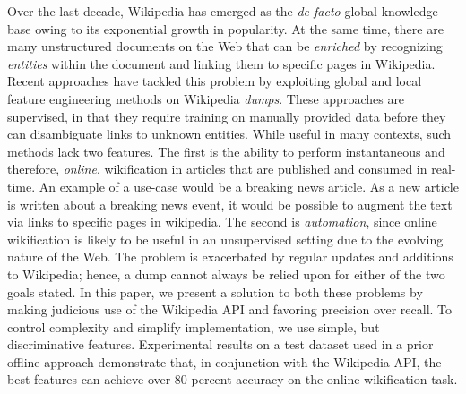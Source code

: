Over the last decade, Wikipedia has emerged as the \emph{de facto} global knowledge base owing to its exponential growth in popularity. At the same time, there are many unstructured documents on the Web that can be \emph{enriched} by recognizing \emph{entities} within the document and linking them to specific pages in Wikipedia. Recent approaches have tackled this problem by exploiting global and local feature engineering methods on Wikipedia \emph{dumps}. These approaches are supervised, in that they require training on manually provided data before they can disambiguate links to unknown entities. While useful in many contexts, such methods lack two features. The first is the ability to perform instantaneous and therefore, \emph{online}, wikification in articles that are published and consumed in real-time. An example of a use-case would be a breaking news article.
As a new article is written about a breaking news event, it would be possible to 
augment the text via links to specific pages in wikipedia.
The second is \emph{automation}, since online wikification is likely to be useful in an unsupervised setting due to the evolving nature of the Web. The problem is exacerbated by regular updates and additions to Wikipedia; hence, a dump cannot always be relied upon for either of the two goals stated. In this paper, we present a solution to both these problems by making judicious use of the Wikipedia API and favoring precision over recall. To control complexity and simplify implementation, we use simple, but discriminative features. 
Experimental results on a test dataset used in a prior offline approach demonstrate that, in conjunction with the Wikipedia API, the best features can achieve over 80 percent accuracy on the online wikification task.  
